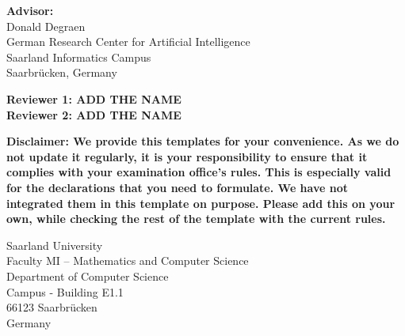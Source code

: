 \pagestyle{empty}

\vspace*{0.5cm}
\textbf{Advisor:}\\
Donald Degraen\\
German Research Center for Artificial Intelligence\\
Saarland Informatics Campus\\
Saarbrücken, Germany

\vspace*{2.5cm}
\textbf{\color{red}  Reviewer 1: ADD THE NAME}\\
\textbf{\color{red}  Reviewer 2: ADD THE NAME}\\


\vspace{4.5cm}

\textbf{\color{red}  Disclaimer: We provide this templates for your convenience. As we do not update it regularly, it is your responsibility to ensure that it complies with your examination office's rules. This is especially valid for the declarations that you need to formulate. We have not integrated them in this template on purpose. Please add this on your own, while checking the rest of the template with the current rules.}


\vspace{3cm}
Saarland University\\
Faculty MI – Mathematics and Computer Science\\
Department of Computer Science\\
Campus - Building E1.1\\
66123 Saarbrücken\\
Germany\\


